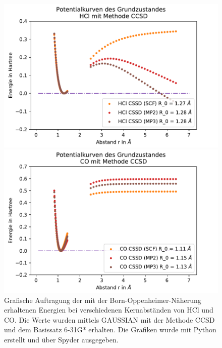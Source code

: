 
\begin{figure}[H]
	
\begin{minipage}{0.5\textwidth}
	\includegraphics[width=\textwidth]{Bilder/HCl_CCSD}
\end{minipage}
\begin{minipage}{0.5\textwidth}
	\includegraphics[width=\textwidth]{Bilder/CO_CCSD}
\end{minipage}

\caption{Grafische Auftragung der mit der Born-Oppenheimer-Näherung erhaltenen Energien bei verschiedenen Kernabständen von HCl und CO. Die Werte wurden mittels GAUSSIAN mit der Methode CCSD und dem Basissatz 6-31G* erhalten. Die Grafiken wurde mit Python erstellt und über Spyder ausgegeben.}


	\label{HCl_CCSD}
\end{figure}


